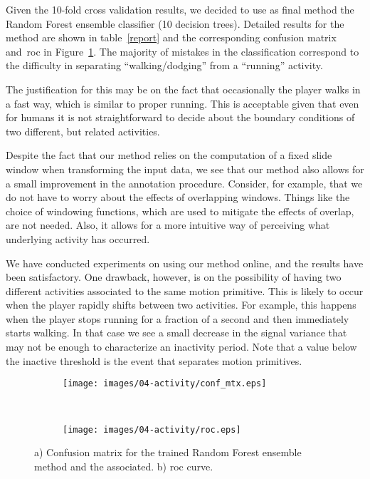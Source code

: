Given the 10-fold cross validation results, we decided to use as final method the Random Forest ensemble classifier (10 decision trees). Detailed results for the method are shown in table~\ref{report} and the corresponding confusion matrix and~\gls{roc} in Figure~\ref{fig:mtx-roc}. The majority of mistakes in the classification correspond to the difficulty in separating ``walking/dodging'' from  a ``running'' activity. 

The justification for this may be on the fact that occasionally the player walks in a fast way, which is similar to proper running. This is acceptable given that even for humans it is not straightforward to decide about the boundary conditions of two different, but related activities.

Despite the fact that our method relies on the computation of a fixed slide window when transforming the input data, we see that our method also allows for a small improvement in the annotation procedure. Consider, for example, that we do not have to worry about the effects of overlapping windows. Things like the choice of windowing functions, which are used to mitigate the effects of overlap, are not needed. Also, it allows for a more intuitive way of perceiving what underlying activity has occurred.

We have conducted experiments on using our method online, and the results have been satisfactory. One drawback, however, is on the possibility of having two different activities associated to the same motion primitive. This is likely to occur when the player rapidly shifts between two activities. For example, this happens when the player stops running for a fraction of a second and then immediately starts walking. In that case we see a small decrease in the signal variance that may not be enough to characterize an inactivity period. Note that a value below the inactive threshold is the event that separates motion primitives.

\begin{figure}[H]
    \centering
    \begin{subfigure}[b]{0.2\textwidth}
       \centering
       \texttt{[image: images/04-activity/conf\_mtx.eps]}
       \caption{}
	\end{subfigure}
	~
    \begin{subfigure}[b]{0.2\textwidth}
     	\centering
        \texttt{[image: images/04-activity/roc.eps]}
        \caption{}
	\end{subfigure}
	\caption{a) Confusion matrix for the trained Random Forest ensemble method and the associated. b) \gls{roc} curve.}\label{fig:mtx-roc}
\end{figure}

